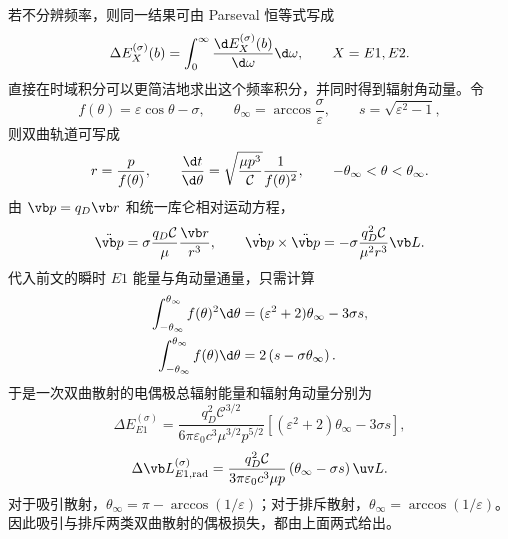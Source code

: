 若不分辨频率，则同一结果可由 Parseval 恒等式写成
\begin{equation*}
	\Delta E_X^{(\sigma)}(b)
	=\int_0^\infty\frac{\d E_X^{(\sigma)}(b)}{\d\omega}\d\omega,
	\qquad X=E1,E2.
\end{equation*}
直接在时域积分可以更简洁地求出这个频率积分，并同时得到辐射角动量。令
\begin{equation*}
	f(\theta)=\varepsilon\cos\theta-\sigma,
	\qquad
	\theta_\infty=\arccos\frac{\sigma}{\varepsilon},
	\qquad
	s=\sqrt{\varepsilon^2-1},
\end{equation*}
则双曲轨道可写成
\begin{equation*}
	r=\frac{p}{f(\theta)},
	\qquad
	\frac{\d t}{\d\theta}
	=\sqrt{\frac{\mu p^3}{\mathcal C}}\frac{1}{f(\theta)^2},
	\qquad
	-\theta_\infty<\theta<\theta_\infty.
\end{equation*}
由 $\vb p=q_D\vb r$ 和统一库仑相对运动方程，
\begin{equation*}
	\ddot{\vb p}
	=\sigma\frac{q_D\mathcal C}{\mu}\frac{\vb r}{r^3},
	\qquad
	\dot{\vb p}\times\ddot{\vb p}
	=-\sigma\frac{q_D^2\mathcal C}{\mu^2r^3}\vb L.
\end{equation*}
代入前文的瞬时 $E1$ 能量与角动量通量，只需计算
\begin{equation*}
	\begin{aligned}
	\int_{-\theta_\infty}^{\theta_\infty}f(\theta)^2\d\theta
	&=(\varepsilon^2+2)\theta_\infty-3\sigma s,\\
	\int_{-\theta_\infty}^{\theta_\infty}f(\theta)\d\theta
	&=2\left(s-\sigma\theta_\infty\right).
	\end{aligned}
\end{equation*}
于是一次双曲散射的电偶极总辐射能量和辐射角动量分别为
\begin{equation*}
	\Delta E_{E1}^{(\sigma)}
	=\frac{q_D^2\mathcal C^{3/2}}
	{6\pi\varepsilon_0c^3\mu^{3/2}p^{5/2}}
	\left[(\varepsilon^2+2)\theta_\infty-3\sigma s\right],
\end{equation*}
\begin{equation*}
	\Delta\vb L_{E1,\mathrm{rad}}^{(\sigma)}
	=\frac{q_D^2\mathcal C}
	{3\pi\varepsilon_0c^3\mu p}
	\left(\theta_\infty-\sigma s\right)\uv L.
\end{equation*}
对于吸引散射，$\theta_\infty=\pi-\arccos(1/\varepsilon)$；对于排斥散射，$\theta_\infty=\arccos(1/\varepsilon)$。因此吸引与排斥两类双曲散射的偶极损失，都由上面两式给出。

